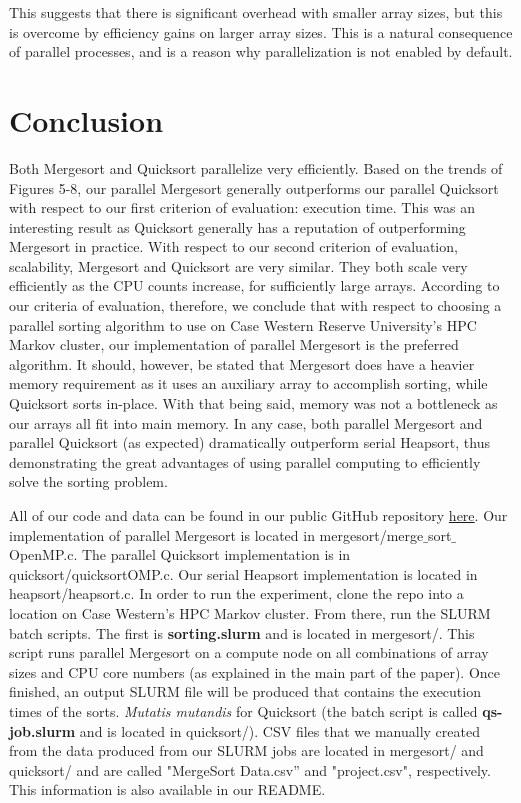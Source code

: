 \documentclass[conference]{IEEEtran}
\begin{document}
	This suggests that there is significant overhead with smaller array sizes, but this is overcome by efficiency gains on larger array sizes. 
	This is a natural consequence of parallel processes, and is a reason why parallelization is not enabled by default. 
	\section{Conclusion}
	Both Mergesort and Quicksort parallelize very efficiently. Based on the trends of Figures 5-8, our parallel Mergesort generally outperforms our parallel Quicksort with respect to our first criterion of evaluation: execution time. This was an interesting result as Quicksort generally has a reputation of outperforming Mergesort in practice. With respect to our second criterion of evaluation, scalability, Mergesort and Quicksort are very similar. They both scale very efficiently as the CPU counts increase, for sufficiently large arrays. According to our criteria of evaluation, therefore, we conclude that with respect to choosing a parallel sorting algorithm to use on Case Western Reserve University’s HPC Markov cluster, our implementation of parallel Mergesort is the preferred algorithm. It should, however, be stated that Mergesort does have a heavier memory requirement as it uses an auxiliary array to accomplish sorting, while Quicksort sorts in-place. With that being said, memory was not a bottleneck as our arrays all fit into main memory. In any case, both parallel Mergesort and parallel Quicksort (as expected) dramatically outperform serial Heapsort, thus demonstrating the great advantages of using parallel computing to efficiently solve the sorting problem.
	
	
	
	\appendix
	
	All of our code and data can be found in our public GitHub repository \href{https://github.com/causeyc/csds438_sorting}{here}. Our implementation of parallel Mergesort is located in mergesort/merge$\_$sort$\_$OpenMP.c. The parallel Quicksort implementation is in quicksort/quicksortOMP.c. Our serial Heapsort implementation is located in heapsort/heapsort.c. In order to run the experiment, clone the repo into a location on Case Western's HPC Markov cluster. From there, run the SLURM batch scripts. The first is \textbf{sorting.slurm} and is located in mergesort/. This script runs parallel Mergesort on a compute node on all combinations of array sizes and CPU core numbers (as explained in the main part of the paper). Once finished, an output SLURM file will be produced that contains the execution times of the sorts. \textit{Mutatis mutandis} for Quicksort (the batch script is called \textbf{qs-job.slurm} and is located in quicksort/). CSV files that we manually created from the data produced from our SLURM jobs are located in mergesort/ and quicksort/ and are called "MergeSort Data.csv'' and "project.csv", respectively. This information is also available in our README.
	
\end{document}
